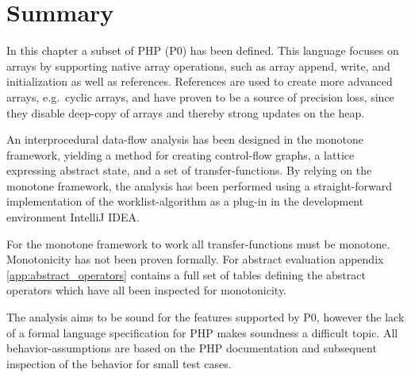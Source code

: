 \section{Summary}

In this chapter a subset of PHP (P0) has been defined. This language focuses on arrays by supporting native array operations, such as array append, write, and initialization as well as references. %
References are used to create more advanced arrays, e.g.\ cyclic arrays, and have proven to be a source of precision loss, since they disable deep-copy of arrays and thereby strong updates on the heap. 

An interprocedural data-flow analysis has been designed in the monotone framework, yielding a method for creating control-flow graphs, a lattice expressing abstract state, and a set of transfer-functions. By relying on the monotone framework, the analysis has been performed using a straight-forward implementation of the worklist-algorithm as a plug-in in the development environment IntelliJ IDEA. 

For the monotone framework to work all transfer-functions must be monotone. Monotonicity has not been proven formally. For abstract evaluation appendix \ref{app:abstract_operators} contains a full set of tables defining the abstract operators which have all been inspected for monotonicity.

The analysis aims to be sound for the features supported by P0, however the lack of a formal language specification for PHP makes soundness a difficult topic. All behavior-assumptions are based on the PHP documentation and subsequent inspection of the behavior for small test cases.